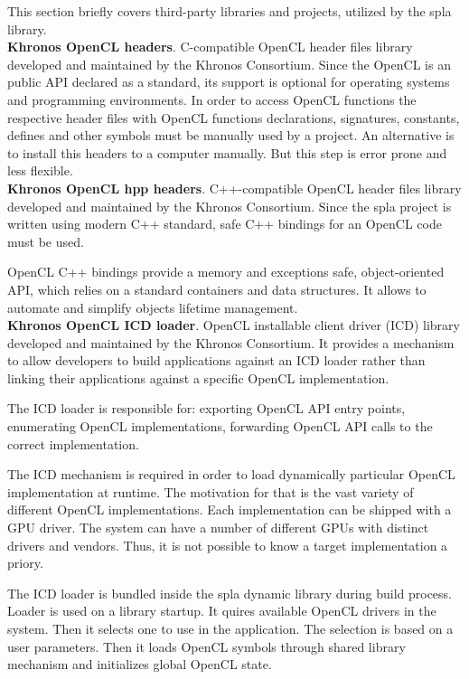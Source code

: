 This section briefly covers third-party libraries and projects, utilized by the spla library.\\

\textbf{Khronos OpenCL headers}. C-compatible OpenCL header files library developed and maintained by the Khronos Consortium. Since the OpenCL is an public API declared as a standard, its support is optional for operating systems and programming environments. In order to access OpenCL functions the respective header files with OpenCL functions declarations, signatures, constants, defines and other symbols must be manually used by a project. An alternative is to install this headers to a computer manually. But this step is error prone and less flexible.\\

\textbf{Khronos OpenCL hpp headers}. C++-compatible OpenCL header files library developed and maintained by the Khronos Consortium. Since the spla project is written using modern C++ standard, safe C++ bindings for an OpenCL code must be used. 

OpenCL C++ bindings provide a memory and exceptions safe, object-oriented API, which relies on a standard containers and data structures. It allows to automate and simplify objects lifetime management. \\

\textbf{Khronos OpenCL ICD loader}. OpenCL installable client driver (ICD) library developed and maintained by the Khronos Consortium. It provides a mechanism to allow developers to build applications against an ICD loader rather than linking their applications against a specific OpenCL implementation. 

The ICD loader is responsible for: exporting OpenCL API entry points, enumerating OpenCL implementations, forwarding OpenCL API calls to the correct implementation.

The ICD mechanism is required in order to load dynamically particular OpenCL implementation at runtime. The motivation for that is the vast variety of different OpenCL implementations. Each implementation can be shipped with a GPU driver. The system can have a number of different GPUs with distinct drivers and vendors. Thus, it is not possible to know a target implementation a priory.

The ICD loader is bundled inside the spla dynamic library during build process. Loader is used on a library startup. It quires available OpenCL drivers in the system. Then it selects one to use in the application. The selection is based on a user parameters. Then it loads OpenCL symbols through shared library mechanism and initializes global OpenCL state.\\


